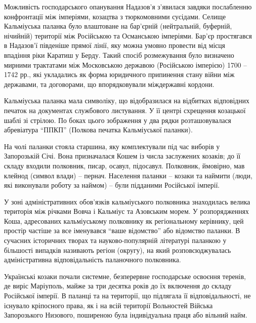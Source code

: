 Можливість господарського опанування Надазов'я з'явилася завдяки послабленню
конфронтації між імперіями, козацтва з тюркомовними сусідами. Селище
Кальміуська паланка було влаштоване на бар'єрній (нейтральній, буферній,
нічийній) території між Російською та Османською імперіями. Бар'єр простягався
в Надазов'ї південіше прямої лінії, яку можна умовно провести від місця
впадіння ріки Каратиш у Берду. Такий спосіб розмежування було визначено мирними
трактатами між Московською державою (Російською імперією)  1700 – 1742 рр., які
укладались як форма юридичного припинення стану війни між державами, та
договорами, що впорядковували міждержавні кордони.


Кальміуська паланка мала символіку, що відобразилася на відбитках відповідних
печаток на документах службового листування. У її центрі схрещення козацької
шаблі зі стрілою. По боках цього зображення у два рядки розташовувалася
абревіатура \enquote{ППКП} (Полкова печатка Кальміуської паланки). 


На чолі паланки стояла старшина, яку комплектували під час виборів у
Запорозькій Січі. Вона призначалася Кошем із числа заслужених козаків; до її
складу входили полковник, писар, осавул, підосавул. Полковник, ймовірно, мав
клейнод (символ влади) – пернач. Населення паланки – козаки та наймити (люди,
які виконували роботу за наймом) – були підданими Російської імперії.

У зоні адміністративних обов'язків кальміуського полковника знаходилась велика
територія між річками Вовча і Кальміус та Азовським морем. У розпорядженнях
Коша, адресованих кальміуському полковнику як регіональному керівнику, цей
простір частіше за все іменувався \enquote{ваше відомство} або відомство паланки. В
сучасних історичних творах та науково-популярній літературі паланкою у
більшості випадків називають регіон (округу), на який розповсюджувалась
адміністративна відповідальність паланочного полковника.

Українські козаки почали системне, безперервне господарське освоєння теренів,
де виріс Маріуполь, майже за три десятка років до їх включення до складу
Російської імперії. В паланці та на території, що підлягала її
відповідальності, не існувало кріпосного права, як і на всій території
Вольностей Війська Запорозького Низового, поширеною була індивідуальна праця
або вільний найм.

